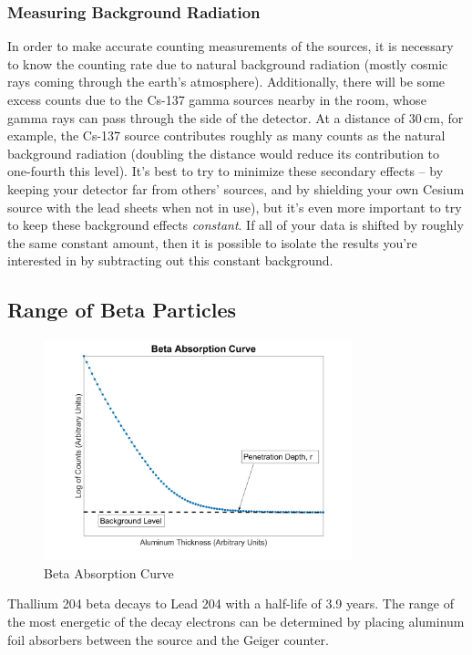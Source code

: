\subsubsection{Measuring Background Radiation}

In order to make accurate counting measurements of the sources, it is necessary to know the counting rate due to natural background radiation (mostly cosmic rays coming through the earth's atmosphere). Additionally, there will be some excess counts due to the Cs-137 gamma sources nearby in the room, whose gamma rays can pass through the side of the detector. At a distance of $30\,\mathrm{cm}$, for example, the Cs-137 source contributes roughly as many counts as the natural background radiation (doubling the distance would reduce its contribution to one-fourth this level). It's best to try to minimize these secondary effects -- by keeping your detector far from others' sources, and by shielding your own Cesium source with the lead sheets when not in use), but it's even more important to try to keep these background effects \emph{constant}. If all of your data is shifted by roughly the same constant amount, then it is possible to isolate the results you're interested in by subtracting out this constant background.

\subsection{Range of Beta Particles}
\begin{figure}[h]
\centering
\includegraphics[width=0.8\textwidth]{./Exp10/pic/betaabsorption.jpg}
\caption{Beta Absorption Curve}
\label{fig:beta}
\end{figure}
Thallium 204 beta decays to Lead 204 with a half-life of 3.9 years. The range of the most energetic of the decay electrons can be determined by placing aluminum foil absorbers between the source and the Geiger counter.\myskip

